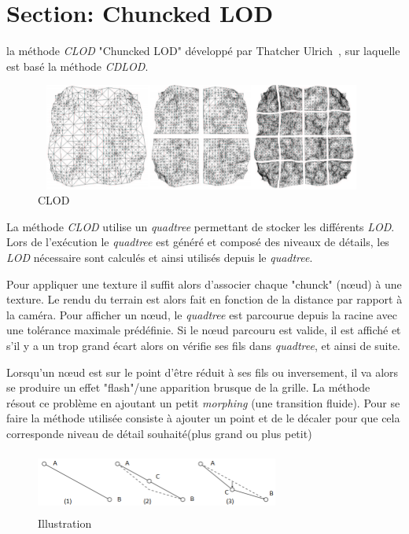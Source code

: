 \section*{Section: Chuncked LOD}
  \label{sec:chunked-lod}

  
  la méthode \textit{CLOD} "Chuncked LOD" développé par Thatcher Ulrich~\cite{CLOD}, sur laquelle est basé la méthode \textit{CDLOD}.

\begin{figure}[!ht]
\centerline{
    \includegraphics[width=11cm,height=3.5cm]{img/clod.png}}
    \caption[CLOD]{CLOD\protect\footnotemark}
    \label{fig:clod}
\end{figure}


  La méthode \emph{CLOD} utilise un \textit{quadtree} permettant de stocker les différents \emph{LOD}. Lors de l'exécution le \emph{quadtree} est généré et composé des niveaux de détails, les \emph{LOD} nécessaire sont calculés et ainsi utilisés depuis le \emph{quadtree}. 
  
  Pour appliquer une texture il suffit alors d'associer chaque "chunck" (n\oe{}ud) à une texture.
  Le rendu du terrain est alors fait en fonction de la distance par rapport à la caméra. Pour afficher un n\oe{}ud, le \emph{quadtree} est parcourue depuis la racine avec une tolérance maximale prédéfinie. Si le n\oe{}ud parcouru est valide, il est affiché et s'il y a un trop grand écart alors on vérifie ses fils dans \emph{quadtree}, et ainsi de suite.
 
  Lorsqu'un n\oe{}ud est sur le point d'être réduit à ses fils ou inversement, il va alors se produire un effet "flash"/une apparition brusque de la grille. La méthode résout ce problème en ajoutant un petit \emph{morphing} (une transition fluide). Pour se faire la méthode utilisée consiste à ajouter un point et de le décaler pour que cela corresponde niveau de détail souhaité(plus grand ou plus petit)
 
 
 \begin{figure}[!ht]
 \centerline{
    \includegraphics[width=8cm,height=2cm]{img/morph-pop.png}}
    \caption[morph]{ Illustration \protect\footnotemark}
    \label{fig:morph-pop}
\end{figure}

